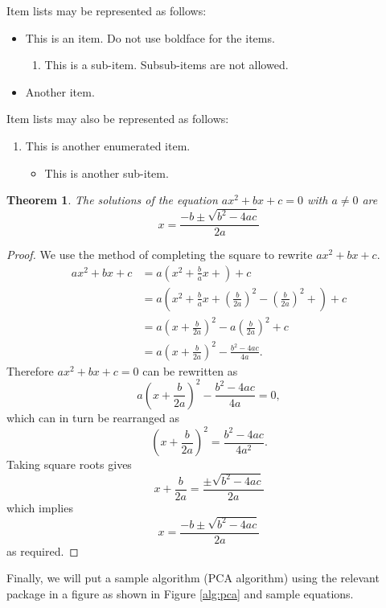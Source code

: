 \documentclass[a4paper,onesided,12pt]{report}
\newtheorem{thm}{Theorem}[chapter]
\begin{document}
Item lists may be represented as follows:

\begin{itemize}
 \item This is an item. Do not use boldface for the items.
\begin{enumerate}
 \item This is a sub-item. Subsub-items are not allowed.
\end{enumerate}
\item Another item.
\end{itemize}
Item lists may also be represented as follows:
\begin{enumerate}
 \item This is another enumerated item.
\begin{itemize}
 \item This is another sub-item.
\end{itemize}

\end{enumerate}

\begin{thm}
The solutions of the equation $ax^2+bx+c=0$ with $a\neq 0$ are
$$
x=\frac{-b\pm \sqrt{b^2-4ac}}{2a}
$$
\end{thm}


\begin{proof}
We use the method of completing the square to rewrite $ax^2+bx+c$.
\begin{align*}
ax^2+bx+c&=a\left( x^2 + \frac{b}{a}x+\right)+c \\
  &=a\left( x^2 + \frac{b}{a}x+ \left(\frac{b}{2a}\right)^2
     -\left(\frac{b}{2a}\right)^2 +\right)+c \\
  &=a\left( x+\frac{b}{2a}\right)^2 - 
a\left(\frac{b}{2a}\right)^2+c\\
  &= a\left( x+\frac{b}{2a}\right)^2- \frac{b^2-4ac}{4a}.
\end{align*}
Therefore $ax^2+bx+c=0$ can be rewritten as 
$$
a\left( x+\frac{b}{2a}\right)^2- \frac{b^2-4ac}{4a}=0,
$$
which can in turn  be rearranged as
$$
\left( x+\frac{b}{2a}\right)^2= \frac{b^2-4ac}{4a^2}.
$$
Taking square roots gives
$$
x+\frac{b}{2a}= \frac{\pm \sqrt{b^2-4ac}}{2a}
$$
which implies
$$
x=\frac{-b\pm \sqrt{b^2-4ac}}{2a}
$$
as required.
\end{proof}
Finally, we will put a sample algorithm (PCA algorithm) using the
relevant package in a figure as shown in Figure \ref{alg:pca} and
sample equations.
\end{document}

